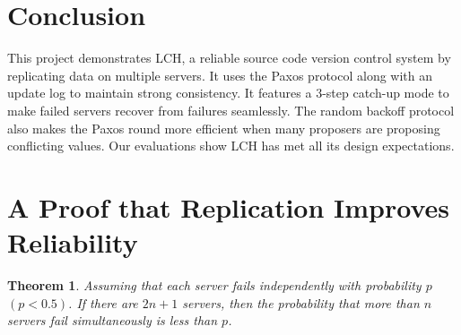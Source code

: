 \documentclass[11pt]{article}
\newtheorem{thm}{Theorem}
\begin{document}
\section{Conclusion}
\label{sec:conclusion}
This project demonstrates LCH, a reliable source code version control system by replicating data on multiple servers.
It uses the Paxos protocol along with an update log to maintain strong consistency.
It features a $3$-step catch-up mode to make failed servers recover from failures seamlessly.
The random backoff protocol also makes the Paxos round more efficient when many proposers are proposing conflicting values.
Our evaluations show LCH has met all its design expectations.


\appendix
\section{A Proof that Replication Improves Reliability}
\begin{thm}
    \label{thm:1}
    Assuming that each server fails independently with probability $p$ $(p<0.5)$.
    If there are $2n+1$ servers, then the probability that more than $n$ servers fail simultaneously is less than $p$.
\end{thm}
\end{document}
